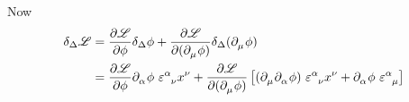 \documentclass{article}
\begin{document}
\noindent Now
\begin{align*}
    \delta_\Delta \mathscr{L} &= \dfrac{ \partial \mathscr{L} }{ \partial \phi } \delta_\Delta \phi + \dfrac{ \partial \mathscr{L} }{ \partial ( \tensor{\partial}{_\mu} \phi ) } \delta_\Delta ( \tensor{\partial}{_\mu} \phi ) \\
    &= \dfrac{ \partial \mathscr{L} }{ \partial \phi } \tensor{\partial}{_\alpha} \phi ~ \tensor{\varepsilon}{^\alpha _\nu} \tensor{x}{^\nu} + \dfrac{ \partial \mathscr{L} }{ \partial ( \tensor{\partial}{_\mu} \phi ) } \left[ ( \tensor{\partial}{_\mu} \tensor{\partial}{_\alpha} \phi ) ~ \tensor{\varepsilon}{^\alpha _\nu} \tensor{x}{^\nu} + \tensor{\partial}{_\alpha} \phi ~ \tensor{\varepsilon}{^\alpha _\mu} \right]
\end{align*}
\end{document}
